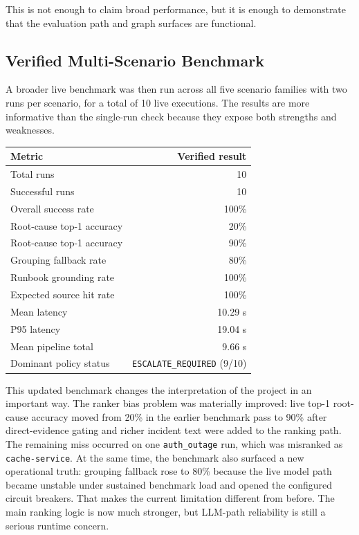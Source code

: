 \documentclass[11pt]{article}
\begin{document}
This is not enough to claim broad performance, but it is enough to demonstrate that the evaluation path and graph surfaces are functional.

\subsection{Verified Multi-Scenario Benchmark}
A broader live benchmark was then run across all five scenario families with two runs per scenario, for a total of 10 live executions. The results are more informative than the single-run check because they expose both strengths and weaknesses.

\begin{center}
\begin{tabular}{lr}
\toprule
Metric & Verified result \\
\midrule
Total runs & 10 \\
Successful runs & 10 \\
Overall success rate & 100\% \\
Root-cause top-1 accuracy & 20\% \\
Root-cause top-1 accuracy & 90\% \\
Grouping fallback rate & 80\% \\
Runbook grounding rate & 100\% \\
Expected source hit rate & 100\% \\
Mean latency & 10.29 s \\
P95 latency & 19.04 s \\
Mean pipeline total & 9.66 s \\
Dominant policy status & \texttt{ESCALATE\_REQUIRED} (9/10) \\
\bottomrule
\end{tabular}
\end{center}

This updated benchmark changes the interpretation of the project in an important way. The ranker bias problem was materially improved: live top-1 root-cause accuracy moved from 20\% in the earlier benchmark pass to 90\% after direct-evidence gating and richer incident text were added to the ranking path. The remaining miss occurred on one \texttt{auth\_outage} run, which was misranked as \texttt{cache-service}. At the same time, the benchmark also surfaced a new operational truth: grouping fallback rose to 80\% because the live model path became unstable under sustained benchmark load and opened the configured circuit breakers. That makes the current limitation different from before. The main ranking logic is now much stronger, but LLM-path reliability is still a serious runtime concern.
\end{document}
